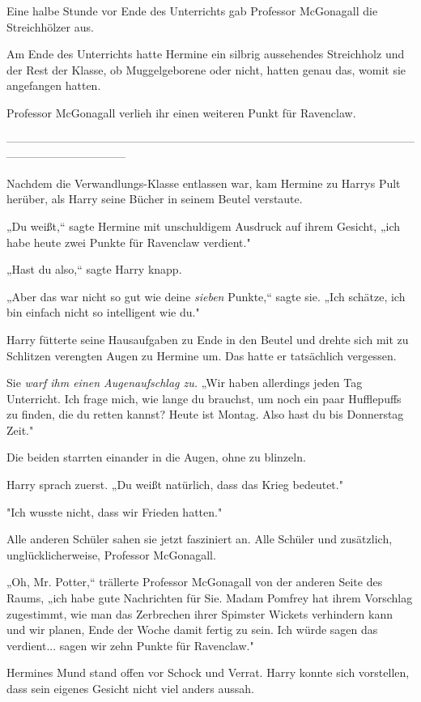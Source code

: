 {Eine halbe Stunde vor Ende des Unterrichts gab Professor McGonagall die Streichhölzer aus.

Am Ende des Unterrichts hatte Hermine ein silbrig aussehendes Streichholz und der Rest der Klasse, ob Muggelgeborene oder nicht, hatten genau das, womit sie angefangen hatten.

Professor McGonagall verlieh ihr einen weiteren Punkt für Ravenclaw.

--------------------------------------------------------------------------------------------------------------------------------------------

\hfill\break Nachdem die Verwandlungs-Klasse entlassen war, kam Hermine zu Harrys Pult herüber, als Harry seine Bücher in seinem Beutel verstaute.

„Du weißt,“ sagte Hermine mit unschuldigem Ausdruck auf ihrem Gesicht, „ich habe heute zwei Punkte für Ravenclaw verdient."

„Hast du also,“ sagte Harry knapp.

„Aber das war nicht so gut wie deine \emph{sieben} Punkte,“ sagte sie. „Ich schätze, ich bin einfach nicht so intelligent wie du."

Harry fütterte seine Hausaufgaben zu Ende in den Beutel und drehte sich mit zu Schlitzen verengten Augen zu Hermine um. Das hatte er tatsächlich vergessen.

Sie \emph{warf ihm einen Augenaufschlag zu.} „Wir haben allerdings jeden Tag Unterricht. Ich frage mich, wie lange du brauchst, um noch ein paar Hufflepuffs zu finden, die du retten kannst? Heute ist Montag. Also hast du bis Donnerstag Zeit."

Die beiden starrten einander in die Augen, ohne zu blinzeln.

Harry sprach zuerst. „Du weißt natürlich, dass das Krieg bedeutet."

"Ich wusste nicht, dass wir Frieden hatten."

Alle anderen Schüler sahen sie jetzt fasziniert an. Alle Schüler und zusätzlich, unglücklicherweise, Professor McGonagall.

„Oh, Mr. Potter,“ trällerte Professor McGonagall von der anderen Seite des Raums, „ich habe gute Nachrichten für Sie. Madam Pomfrey hat ihrem Vorschlag zugestimmt, wie man das Zerbrechen ihrer Spimster Wickets verhindern kann und wir planen, Ende der Woche damit fertig zu sein. Ich würde sagen das verdient... sagen wir zehn Punkte für Ravenclaw."

Hermines Mund stand offen vor Schock und Verrat. Harry konnte sich vorstellen, dass sein eigenes Gesicht nicht viel anders aussah.

}
